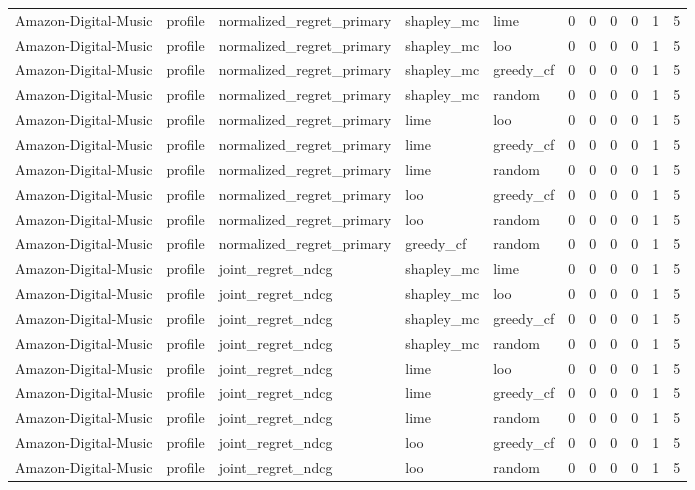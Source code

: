 \begin{table}[t]
{\begin{tabular}{lllllrrrrrr}
Amazon-Digital-Music & profile & normalized\_regret\_primary & shapley\_mc & lime & 0 & 0 & 0 & 0 & 1 & 5 \\
Amazon-Digital-Music & profile & normalized\_regret\_primary & shapley\_mc & loo & 0 & 0 & 0 & 0 & 1 & 5 \\
Amazon-Digital-Music & profile & normalized\_regret\_primary & shapley\_mc & greedy\_cf & 0 & 0 & 0 & 0 & 1 & 5 \\
Amazon-Digital-Music & profile & normalized\_regret\_primary & shapley\_mc & random & 0 & 0 & 0 & 0 & 1 & 5 \\
Amazon-Digital-Music & profile & normalized\_regret\_primary & lime & loo & 0 & 0 & 0 & 0 & 1 & 5 \\
Amazon-Digital-Music & profile & normalized\_regret\_primary & lime & greedy\_cf & 0 & 0 & 0 & 0 & 1 & 5 \\
Amazon-Digital-Music & profile & normalized\_regret\_primary & lime & random & 0 & 0 & 0 & 0 & 1 & 5 \\
Amazon-Digital-Music & profile & normalized\_regret\_primary & loo & greedy\_cf & 0 & 0 & 0 & 0 & 1 & 5 \\
Amazon-Digital-Music & profile & normalized\_regret\_primary & loo & random & 0 & 0 & 0 & 0 & 1 & 5 \\
Amazon-Digital-Music & profile & normalized\_regret\_primary & greedy\_cf & random & 0 & 0 & 0 & 0 & 1 & 5 \\
Amazon-Digital-Music & profile & joint\_regret\_ndcg & shapley\_mc & lime & 0 & 0 & 0 & 0 & 1 & 5 \\
Amazon-Digital-Music & profile & joint\_regret\_ndcg & shapley\_mc & loo & 0 & 0 & 0 & 0 & 1 & 5 \\
Amazon-Digital-Music & profile & joint\_regret\_ndcg & shapley\_mc & greedy\_cf & 0 & 0 & 0 & 0 & 1 & 5 \\
Amazon-Digital-Music & profile & joint\_regret\_ndcg & shapley\_mc & random & 0 & 0 & 0 & 0 & 1 & 5 \\
Amazon-Digital-Music & profile & joint\_regret\_ndcg & lime & loo & 0 & 0 & 0 & 0 & 1 & 5 \\
Amazon-Digital-Music & profile & joint\_regret\_ndcg & lime & greedy\_cf & 0 & 0 & 0 & 0 & 1 & 5 \\
Amazon-Digital-Music & profile & joint\_regret\_ndcg & lime & random & 0 & 0 & 0 & 0 & 1 & 5 \\
Amazon-Digital-Music & profile & joint\_regret\_ndcg & loo & greedy\_cf & 0 & 0 & 0 & 0 & 1 & 5 \\
Amazon-Digital-Music & profile & joint\_regret\_ndcg & loo & random & 0 & 0 & 0 & 0 & 1 & 5 \\

\end{tabular}}
\end{table}
